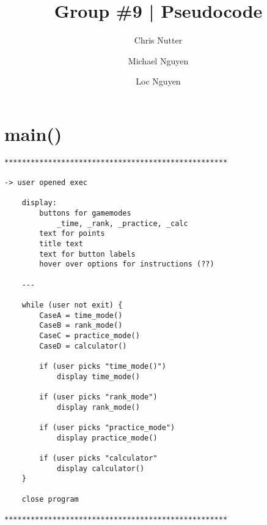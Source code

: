 \documentclass[12pt]{article}
\title{Group \#9 | Pseudocode}
\author{Chris Nutter\and Michael Nguyen\and Loc Nguyen}
\date
\begin{document}
\maketitle

\section{main()}
    \begin{verbatim}
***************************************************

-> user opened exec

    display:
        buttons for gamemodes
            _time, _rank, _practice, _calc
        text for points
        title text
        text for button labels
        hover over options for instructions (??)

    ---

    while (user not exit) {
        CaseA = time_mode()
        CaseB = rank_mode()
        CaseC = practice_mode()
        CaseD = calculator()

        if (user picks "time_mode()")
            display time_mode()

        if (user picks "rank_mode")
            display rank_mode()

        if (user picks "practice_mode")
            display practice_mode()

        if (user picks "calculator"
            display calculator()
    }

    close program

***************************************************
    \end{verbatim}

\newpage
\end{document}
